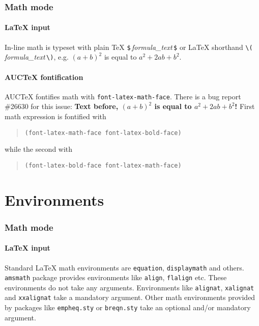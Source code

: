 \documentclass[a4paper]{article}
\begin{document}
\section{Math mode}

\subsection{\protect\LaTeX{} input}

In-line math is typeset with plain \TeX{}
\verb|$|\,\textsl{formula\_text}\,\verb|$| or \LaTeX{} shorthand
\verb|\(|\,\textsl{formula\_text}\,\verb|\)|, e.g. $(a+b)^2$ is equal
to \(a^2+2ab+b^2\).

\subsection{AUC\protect\TeX{} fontification}

AUC\TeX{} fontifies math with \texttt{font-latex-math-face}.  There is
a bug report \#26630 for this issue: {\bfseries Text before, $(a+b)^2$
  is equal to \(a^2+2ab+b^2\)!}  First math expression is fontified
with
\begin{quote}
  \verb|(font-latex-math-face font-latex-bold-face)|
\end{quote}
while the second with
\begin{quote}
  \verb|(font-latex-bold-face font-latex-math-face)|
\end{quote}

\part{Environments}

\section{Math mode}

\subsection{\protect\LaTeX{} input}

Standard \LaTeX{} math environments are \verb|equation|,
\verb|displaymath| and others.  \verb|amsmath| package provides
environments like \verb|align|, \verb|flalign| etc.  These
environments do not take any arguments.  Environments like
\verb|alignat|, \verb|xalignat| and \verb|xxalignat| take a mandatory
argument.  Other math environments provided by packages like
\verb|empheq.sty| or \verb|breqn.sty| take an optional and/or
mandatory argument.
\end{document}
